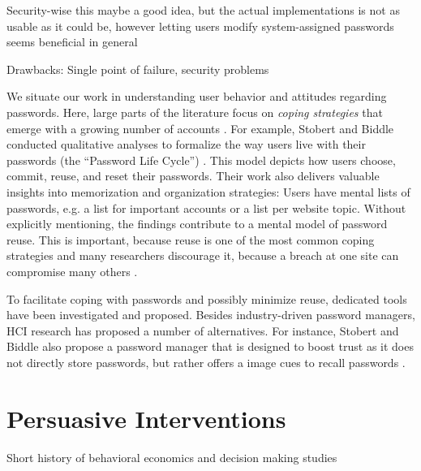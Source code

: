 		Security-wise this maybe a good idea, but the actual implementations is not as usable as it could be, however letting users modify system-assigned passwords seems beneficial in general \cite{Huha2015UserReplaceablePasswords}
	
	Drawbacks: Single point of failure, security problems 
	
	We situate our work in understanding user behavior and attitudes regarding passwords. Here, large parts of the literature focus on \textit{coping strategies} that emerge with a growing number of accounts \cite{Florencio2007LargeScaleStudyPasswordHabits, Florencio2014PasswordPortfoliosFiniteUser}. For example, Stobert and Biddle conducted qualitative analyses to formalize the way users live with their passwords (the ``Password Life Cycle'') \cite{Stobert2014PasswordLifeCycle}. This model depicts how users choose, commit, reuse, and reset their passwords. Their work also delivers valuable insights into memorization and organization strategies: Users have mental lists of passwords, e.g. a list for important accounts or a list per website topic. Without explicitly mentioning, the findings contribute to a mental model of password reuse. This is important, because reuse is one of the most common coping strategies \cite{Das2014TangledWeb, Gaw2006PasswordManagement, Hayashi2011DiaryStudyPWs} and many researchers discourage it, because a breach at one site can compromise many others \cite{Bonneau2012ScienceOfGuessing, Komanduri2011OfPasswordsAndPeople}. 
	
	To facilitate coping with passwords and possibly minimize reuse, dedicated tools have been investigated and proposed. Besides industry-driven password managers, HCI research has proposed a number of alternatives. For instance, Stobert and Biddle also propose a password manager that is designed to boost trust as it does not directly store passwords, but rather offers a image cues to recall passwords \cite{Stobert2014PWMThatDoesntRemember}. 
	
	
	\cite{Bojinov2010KamouflagePWM}
	
	\cite{Fagan2017UsersConsiderationsPWMs}


	\section{Persuasive Interventions}\label{sec:rw:persuasive-interventions}
	Short history of behavioral economics and decision making studies
	
